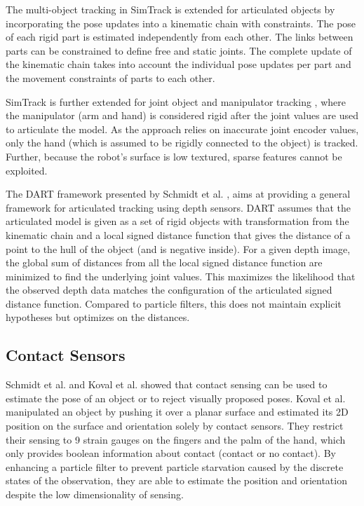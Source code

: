 The multi-object tracking in SimTrack is extended for articulated objects \cite{Pauwels2014} by incorporating the pose updates into a kinematic chain with constraints. The pose of each rigid part is estimated independently from each other. The links between parts can be constrained to define free and static joints. The complete update of the kinematic chain takes into account the individual pose updates per part and the movement constraints of parts to each other.

SimTrack is further extended for joint object and manipulator tracking \cite{Pauwels2014b}, where the manipulator (arm and hand) is considered rigid after the joint values are used to articulate the model. As the approach relies on inaccurate joint encoder values, only the hand (which is assumed to be rigidly connected to the object) is tracked. Further, because the robot's surface is low textured, sparse features cannot be exploited.

The DART framework presented by Schmidt et al. \cite{Schmidt2015}, \cite{Schmidt2015b} aims at providing a general framework for articulated tracking using depth sensors. DART assumes that the articulated model is given as a set of rigid objects with transformation from the kinematic chain and a local signed distance function that gives the distance of a point to the hull of the object (and is negative inside). For a given depth image, the global sum of distances from all the local signed distance function are minimized to find the underlying joint values. This maximizes the likelihood that the observed depth data matches the configuration of the articulated signed distance function. Compared to particle filters, this does not maintain explicit hypotheses but optimizes on the distances.

\subsection{Contact Sensors}

Schmidt et al. \cite{Schmidt2015b} and Koval et al. \cite{Koval2015} showed that contact sensing can be used to estimate the pose of an object or to reject visually proposed poses.
Koval et al. \cite{Koval2015} manipulated an object by pushing it over a planar surface and estimated its 2D position on the surface and orientation solely by contact sensors. They restrict their sensing to 9 strain gauges on the fingers and the palm of the hand, which only provides boolean information about contact (contact or no contact). By enhancing a particle filter to prevent particle starvation caused by the discrete states of the observation, they are able to estimate the position and orientation despite the low dimensionality of sensing.

